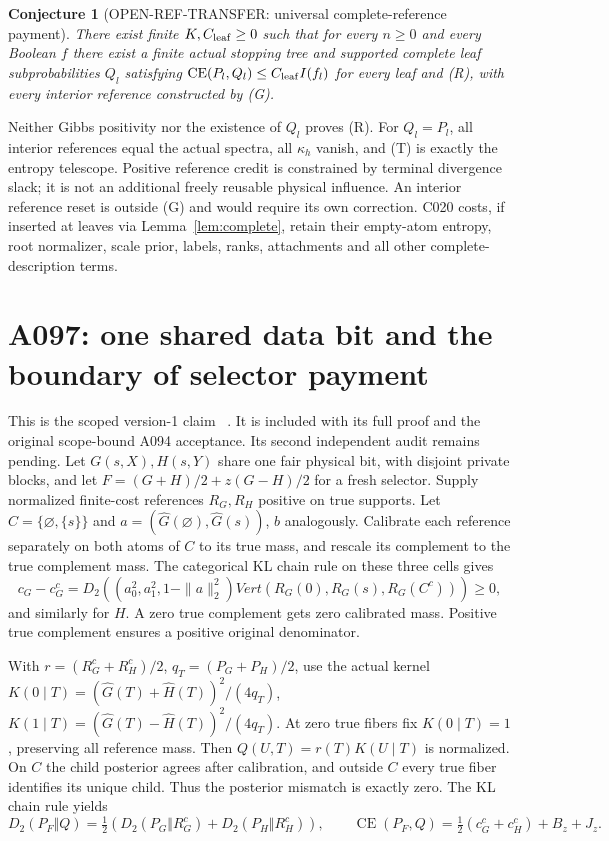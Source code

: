 \documentclass[11pt]{article}
\newtheorem{conjecture}[lemma]{Conjecture}
\newcommand{\CE}{\operatorname{CE}}
\begin{document}
\begin{conjecture}[OPEN-REF-TRANSFER: universal complete-reference payment]
\label{conj:reference}
There exist finite $K,C_{\rm leaf}\ge0$ such that for every
$n\ge0$ and every Boolean $f$ there exist a finite actual stopping
tree and supported complete leaf subprobabilities $Q_l$ satisfying
$\CE(P_l,Q_l)\le C_{\rm leaf}I(f_l)$ for every leaf and (R),
with every interior reference constructed by (G).
\end{conjecture}
Neither Gibbs positivity nor the existence of $Q_l$ proves (R).
For $Q_l=P_l$, all interior references equal the actual spectra,
all $\kappa_h$ vanish, and (T) is exactly the entropy telescope.
Positive reference credit is constrained by terminal divergence
slack; it is not an additional freely reusable physical influence.
An interior reference reset is outside (G) and would require its
own correction. C020 costs, if inserted at leaves via
Lemma~\ref{lem:complete}, retain their empty-atom entropy, root
normalizer, scale prior, labels, ranks, attachments and all other
complete-description terms.

\section{A097: one shared data bit and the boundary of selector payment}
\label{sec:shared}
This is the scoped version-1 claim
~\cite{A097c}.
It is included with its full proof and the original scope-bound
A094 acceptance. Its second independent audit remains pending. Let $G(s,X),H(s,Y)$ share one fair physical bit,
with disjoint private blocks, and let $F=(G+H)/2+z(G-H)/2$ for a fresh selector.
Supply normalized finite-cost references $R_G,R_H$ positive on true supports.
Let $C=\{\varnothing,\{s\}\}$ and
$a=(\widehat G(\varnothing),\widehat G(s))$, $b$ analogously.
Calibrate each reference separately on both atoms of $C$ to its true
mass, and rescale its complement to the true complement mass.
The categorical KL chain rule on these three cells gives
\[
 c_G-c_G^c=D_2((a_0^2,a_1^2,1-\|a\|_2^2)Vert
          (R_G(0),R_G(s),R_G(C^c)))\ge0,
\]
and similarly for $H$. A zero true complement gets zero calibrated mass.
Positive true complement ensures a positive original denominator.

With $r=(R_G^c+R_H^c)/2$, $q_T=(P_G+P_H)/2$, use the actual kernel
$K(0\mid T)=(\widehat G(T)+\widehat H(T))^2/(4q_T)$,
$K(1\mid T)=(\widehat G(T)-\widehat H(T))^2/(4q_T)$.
At zero true fibers fix $K(0\mid T)=1$, preserving all reference mass.
Then $Q(U,T)=r(T)K(U\mid T)$ is normalized. On $C$ the child posterior
agrees after calibration, and outside $C$ every true fiber identifies
its unique child. Thus the posterior mismatch is exactly zero.
The KL chain rule yields
\[
 D_2(P_F\Vert Q)=\tfrac12(D_2(P_G\Vert R_G^c)+D_2(P_H\Vert R_H^c)),
 \qquad \CE(P_F,Q)=\tfrac12(c_G^c+c_H^c)+B_z+J_z.
\]
\end{document}
